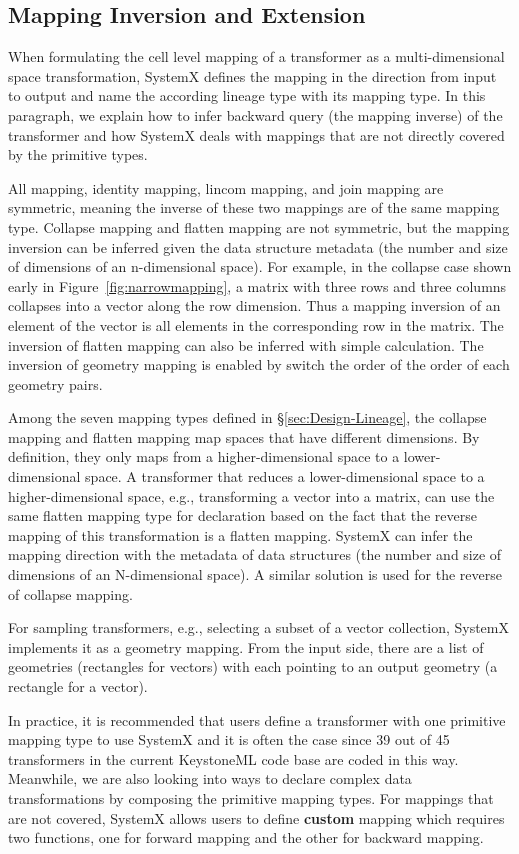 \documentclass{sig-alternate}
\begin{document}
\subsection{Mapping Inversion and Extension}
When formulating the cell level mapping of a transformer as a multi-dimensional space transformation, SystemX defines
the mapping in the direction from input to output and name the according lineage type with its mapping type.
In this paragraph, we explain how to infer backward query (the mapping inverse) of the transformer and how SystemX deals
with mappings that are not directly covered by the primitive types.

All mapping, identity mapping, lincom mapping, and join mapping are symmetric, 
meaning the inverse of these two mappings are of the same mapping type.
Collapse mapping and flatten mapping are not symmetric, but the mapping inversion can be inferred
given the data structure metadata (the number and size of dimensions of an n-dimensional space). For example, 
in the collapse case shown early in Figure~\ref{fig:narrowmapping}, a matrix with three rows and three columns
collapses into a vector along the row dimension. Thus a mapping inversion of an element of the vector
is all elements in the corresponding row in the matrix. 
The inversion of flatten mapping can also be inferred with simple calculation.
The inversion of geometry mapping is enabled by switch the order of the order of each geometry pairs.


Among the seven mapping types defined in \S\ref{sec:Design-Lineage}, the collapse mapping and flatten mapping
map spaces that have different dimensions. By definition, they only maps from a higher-dimensional space to a lower-dimensional space.
A transformer that reduces a lower-dimensional space to a higher-dimensional space, e.g., transforming a vector into a matrix, can use
the same flatten mapping type for declaration based on the fact that the reverse mapping of this transformation is a
flatten mapping. SystemX can infer the mapping direction with the metadata of data structures 
(the number and size of dimensions of an N-dimensional space). 
A similar solution is used for the reverse of collapse mapping.

For sampling transformers, e.g., selecting a subset of a vector collection, SystemX implements it as a geometry mapping.
From the input side, there are a list of geometries (rectangles for vectors) with each pointing to an output geometry (a rectangle for a vector).

In practice, it is recommended that users define a transformer with one primitive mapping type to use SystemX and it is often the case since
39 out of 45 transformers in the current KeystoneML code base are coded in this way. 
Meanwhile, we are also looking into ways to declare complex data transformations by composing the primitive mapping types.
For mappings that are not covered, SystemX allows users to define {\bf custom} mapping
which requires two functions, one for forward mapping and the other for backward mapping.
\end{document}
